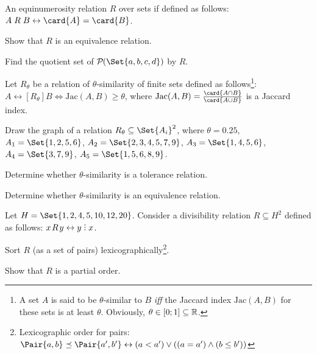 \documentclass[a4paper,12pt]{article}
\newcommand{\Jac}{%
    \mathrm{Jac}}
\begin{document}
\begin{tasks}
    \item An equinumerosity relation $R$ over sets if defined as follows: $A \rel B \iff \card{A} =\nobreak \card{B}$.

    \begin{subtasks}
        \item Show that $R$ is an equivalence relation.
        \item Find the quotient set of $\powerset{\Set{a,b,c,d}}$ by $R$.
    \end{subtasks}


    \item Let $R_{\theta}$ be a relation of $\theta$-similarity of finite sets defined as follows\footnote{A set $A$ is said to be $\theta$-similar to $B$ \textit{iff} the Jaccard index $\Jac(A,B)$ for these sets is at least $\theta$. Obviously, $\theta \in [0; 1] \subseteq \mathbb{R}$.}: $A \rel[R_{\theta}] B \iff \Jac(A,B) \geq \theta$, where $\Jac(A,B) = \frac{\card{A \intersection B}}{\card{A \union B}}$ is a Jaccard index.

    \begin{subtasks}
        \item Draw the graph of a relation $R_{\theta} \subseteq \Set{A_i}^2$, where $\theta = 0.25$, $A_1 = \Set{1,2,5,6}$, $A_2 = \Set{2,3,4,5,7,9}$, $A_3 = \Set{1,4,5,6}$, $A_4 = \Set{3,7,9}$, $A_5 = \Set{1,5,6,8,9}$.
        \item Determine whether $\theta$-similarity is a tolerance relation.
        \item Determine whether $\theta$-similarity is an equivalence relation.
    \end{subtasks}


    \item Let $H = \Set{1, 2, 4, 5, 10, 12, 20}$.
    Consider a divisibility relation $R \subseteq H^2$ defined as follows: $x \!\rel\!\nobreak y \iff y \divby\nobreak x$.

    \begin{subtasks}
        \item Sort $R$ (as a set of pairs) lexicographically\footnote{Lexicographic order for pairs: $\Pair{a,b} \preceq \Pair{a',b'} \iff (a < a') \lor ((a = a') \land (b \leq b'))$}.

        \item Show that $R$ is a partial order.


\end{subtasks}
\end{tasks}
\end{document}
